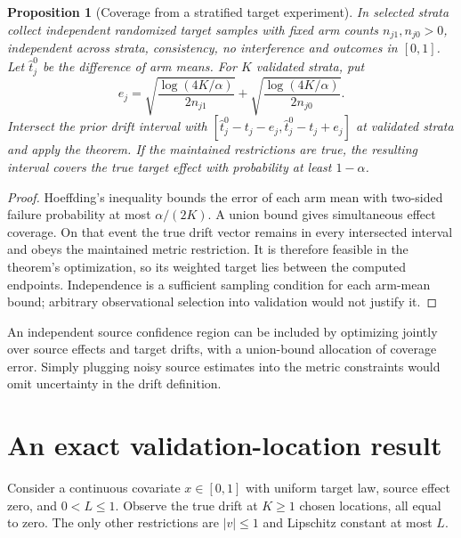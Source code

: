 \documentclass[11pt]{article}
\newtheorem{proposition}[theorem]{Proposition}
\theoremstyle{remark}
\begin{document}
\begin{proposition}[Coverage from a stratified target experiment]
In selected strata collect independent randomized target samples with fixed arm counts $n_{j1},n_{j0}>0$, independent across strata, consistency, no interference and outcomes in $[0,1]$. Let $\widehat t_j^0$ be the difference of arm means. For $K$ validated strata, put
\[
 e_j=\sqrt{\frac{\log(4K/\alpha)}{2n_{j1}}}
       +\sqrt{\frac{\log(4K/\alpha)}{2n_{j0}}}.
\]
Intersect the prior drift interval with
$[\widehat t_j^0-t_j-e_j,\widehat t_j^0-t_j+e_j]$ at validated strata and apply the theorem. If the maintained restrictions are true, the resulting interval covers the true target effect with probability at least $1-\alpha$.
\end{proposition}
\begin{proof}
Hoeffding's inequality bounds the error of each arm mean with two-sided failure probability at most $\alpha/(2K)$. A union bound gives simultaneous effect coverage. On that event the true drift vector remains in every intersected interval and obeys the maintained metric restriction. It is therefore feasible in the theorem's optimization, so its weighted target lies between the computed endpoints. Independence is a sufficient sampling condition for each arm-mean bound; arbitrary observational selection into validation would not justify it.
\end{proof}
An independent source confidence region can be included by optimizing jointly over source effects and target drifts, with a union-bound allocation of coverage error. Simply plugging noisy source estimates into the metric constraints would omit uncertainty in the drift definition.

\section*{An exact validation-location result}
Consider a continuous covariate $x\in[0,1]$ with uniform target law, source effect zero, and $0<L\le1$. Observe the true drift at $K\ge1$ chosen locations, all equal to zero. The only other restrictions are $|v|\le1$ and Lipschitz constant at most $L$.
\end{document}
